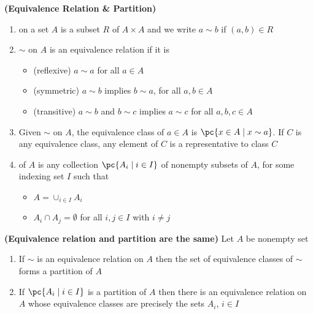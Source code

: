 \documentclass[11pt]{article}
\begin{document}
\begin{definition*}
    \textbf{(Equivalence Relation \& Partition)}
    \begin{enumerate}
        \item {} on a set $A$ is a subset $R$ of $A\times A$ and we write $a\sim b$ if $(a,b)\in R$
        \item {} $\sim$ on $A$ is an equivalence relation if it is 
        \begin{itemize}
            \item (reflexive) $a\sim a$ for all $a\in A$
            \item (symmetric) $a\sim b$ implies $b\sim a$, for all $a,b\in A$
            \item (transitive) $a\sim b$ and $b\sim c$ implies $a\sim c$ for all $a,b,c\in A$
        \end{itemize}
        \item {} Given $\sim$ on $A$, the equivalence class of $a \in A$ is $\pc{x\in A \mid x\sim a}$. If $C$ is any equivalence class, any element of $C$ is a representative to class $C$
        \item {} of $A$ is any collection $\pc{A_i \mid i\in I}$ of nonempty subsets of $A$, for some indexing set $I$ such that 
        \begin{itemize}
            \item $A = \cup_{i\in I} A_i$
            \item $A_i \cap A_j = \emptyset$ for all $i,j\in I$ with $i\neq j$
        \end{itemize}
    \end{enumerate}
\end{definition*}

\begin{proposition*} \textbf{(Equivalence relation and partition are the same)} Let $A$ be nonempty set
    \begin{enumerate}
        \item If $\sim$ is an equivalence relation on $A$ then the set of equivalence classes of $\sim$ forms a partition of $A$
        \item If $\pc{A_i\mid i\in I}$ is a partition of $A$ then there is an equivalence relation on $A$ whose equivalence classes are precisely the sets $A_i$, $i\in I$ 
    \end{enumerate}
\end{proposition*}
\end{document}
